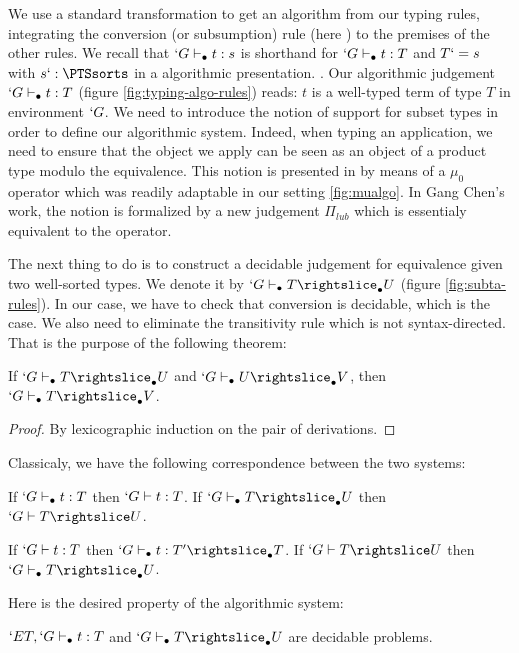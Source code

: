 \documentclass[twocolumn]{article}
\begin{document}
We use a standard transformation to get an algorithm from our typing
rules, integrating the conversion (or subsumption) rule
(here ) to the premises of the other rules.
We recall that $`G \vdash_{\bullet} t : s$ is shorthand for $`G \vdash_{\bullet} t : T$ and
$T `= s$ with $s `: \PTSsorts$ in a algorithmic presentation.
. Our algorithmic judgement $`G \vdash_{\bullet} t : T$
(figure \vref{fig:typing-algo-rules})
reads: $t$ is a well-typed term of type $T$ in environment $`G$.
We need to introduce the notion of support for subset types in order to
define our algorithmic system. Indeed, when typing an application, 
we need to ensure that the object we apply can be seen as an object of a
product type modulo the equivalence. This notion is presented in \PVS{} by
means of a $\mu_0$ operator which was readily adaptable in our setting
\ref{fig:mualgo}. In Gang Chen's work, the notion is formalized by a
new judgement $\Pi_{lub}$ which is essentialy equivalent to the operator.

The next thing to do is to construct a decidable judgement for
equivalence given two well-sorted types. We denote it by $`G \typea T
\suba U$ (figure \ref{fig:subta-rules}).
In our case, we have to check that conversion is decidable, which is the
case. We also need to eliminate the transitivity rule which is not
syntax-directed. That is the purpose of the following theorem:
\begin{theorem}
  If $`G \typea T \suba U$ and $`G \typea U \suba V$, then $`G \typea T
  \suba V$.
\end{theorem}
\begin{proof}
  By lexicographic induction on the pair of derivations.
\end{proof}

Classicaly, we have the following correspondence between the two
systems:
\begin{theorem}[Soundness]
  If $`G \vdash_{\bullet} t : T$ then $`G \vdash t : T$.
  If $`G \typea T \suba U$ then $`G \typed T \subd U$.
\end{theorem}

\begin{theorem}[Completeness]
  If $`G \vdash t : T$ then $`G \typea t : T' \suba T$.
  If $`G \typed T \subd U$ then $`G \typea T \suba U$.
\end{theorem}

Here is the desired property of the algorithmic system:
\begin{theorem}
  $`E T, `G \vdash_{\bullet} t : T$ and $`G \typea T \suba U$ are decidable
  problems.
\end{theorem}
\end{document}
